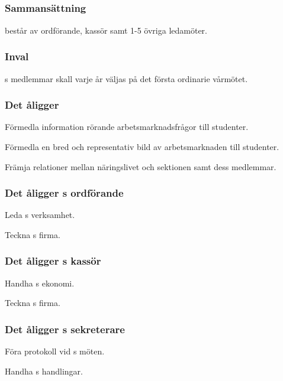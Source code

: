 \subsection{\ARMITFULL{}}
\subsubsection{Sammansättning}
\ARMIT{} består av ordförande, kassör samt 1-5 övriga ledamöter.

\subsubsection{Inval}
\ARMIT{}s medlemmar skall varje år väljas på det första ordinarie vårmötet.

\subsubsection{Det åligger \ARMIT{}}
\begin{att}
	\item Förmedla information rörande arbetsmarknadsfrågor till studenter.
	\item Förmedla en bred och representativ bild av arbetsmarknaden till studenter.
	\item Främja relationer mellan näringslivet och sektionen samt dess medlemmar.
\end{att}

\subsubsection{Det åligger \ARMIT{}s ordförande}
\begin{att}
	\item Leda \ARMIT{}s verksamhet.
	\item Teckna \ARMIT{}s firma.
\end{att}

\subsubsection{Det åligger \ARMIT{}s kassör}
\begin{att}
	\item Handha \ARMIT{}s ekonomi.
	\item Teckna \ARMIT{}s firma.
\end{att}

\subsubsection{Det åligger \ARMIT{}s sekreterare}
\begin{att}
	\item Föra protokoll vid \ARMIT{}s möten.
	\item Handha \ARMIT{}s handlingar.
\end{att}